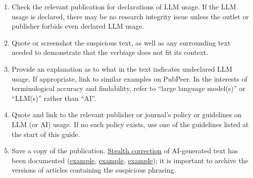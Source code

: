 \documentclass[letterpaper, 12pt]{article}
\begin{document}
\begin{enumerate}
\setlength\itemsep{-0.5em}
\item
  Check the relevant publication for declarations of LLM usage. If the LLM
  usage is declared, there may be no research integrity issue unless the
  outlet or publisher forbids even declared LLM usage.
\item
  Quote or screenshot the suspicious text, as well as any surrounding
  text needed to demonstrate that the verbiage does not fit its context.
\item
  Provide an explanation as to what in the text indicates undeclared LLM
  usage. If appropriate, link to similar examples on PubPeer. In the interests of terminological
  accuracy and findability, refer to ``large language model(s)'' or ``LLM(s)'' rather than ``AI''.
\item
  Quote and link to the relevant publisher or journal's policy or
  guidelines on LLM (or AI) usage.
    If no such policy exists, use one of the guidelines listed at the start of this guide.
\item
  Save a copy of the publication. \href{https://osf.io/2kdez/files/34nj5}{Stealth correction} of AI-generated text has been documented (\href{https://pubpeer.com/publications/2C3A675054700F4010667A5F4D3C55#2}{example}, \href{https://pubpeer.com/publications/82AE520EA54FC025369F9CD6E17C68#4}{example}, \href{https://pubpeer.com/publications/6928A4CF107F68CFB0116552272C0F#3}{example});
  it is important to archive the versions of articles containing the
  suspicious phrasing.
\end{enumerate}
\end{document}
